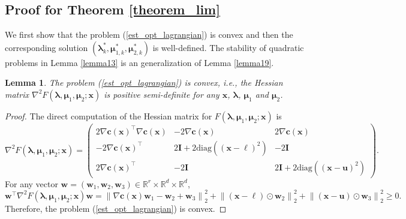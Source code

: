 \documentclass[aos]{imsart}
\numberwithin{equation}{section}
\theoremstyle{plain}
\newtheorem{lemma}{Lemma}
\begin{document}
\begin{appendix}
    \subsection{Proof for Theorem \ref{theorem_lim}}
We first show that the problem (\ref{est_opt_lagrangian}) is convex and then the corresponding solution $(\bm{\lambda}_{k}^{*}, \bm{\mu}_{1,k}^{*}, \bm{\mu}_{2,k}^{*})$ is well-defined. The stability of quadratic problems in Lemma \ref{lemma13} is an generalization of Lemma \ref{lemma19}.
    \begin{lemma}
    The problem (\ref{est_opt_lagrangian}) is convex, i.e., the Hessian matrix $\nabla^2 F(\bm{\lambda}, \bm{\mu}_{1}, \bm{\mu}_2; \bm{x})$ is positive semi-definite for any $\bm{x}$, $\bm{\lambda}$, $\bm{\mu}_{1}$ and $\bm{\mu}_2$. 
\end{lemma}


\begin{proof}
    The direct computation of the Hessian matrix for $F(\bm{\lambda}, \bm{\mu}_{1}, \bm{\mu}_2; \bm{x})$ is
    \begin{equation}
        \nabla^2 F(\bm{\lambda}, \bm{\mu}_{1}, \bm{\mu}_2; \bm{x}) = \left( \begin{array}{ccc}
            2 \nabla \bm{c}(\bm{x})^{\top} \nabla \bm{c}(\bm{x})  & -2 \nabla \bm{c}(\bm{x}) & 2 \nabla \bm{c}(\bm{x}) \\
            -2 \nabla \bm{c}(\bm{x})^{\top} & 2 \bm{I} + 2 \text{diag}\left( \left( \bm{x} - \bm{\ell} \right)^2 \right) & -2 \bm{I} \\
            2 \nabla \bm{c}(\bm{x})^{\top} & -2 \bm{I} & 2 \bm{I} + 2 \text{diag}\left( \left( \bm{x} - \bm{u} \right)^2 \right) 
        \end{array} \right).
    \end{equation}
    For any vector $\bm{w} = (\bm{w}_1, \bm{w}_2, \bm{w}_3) \in \mathbb{R}^{r} \times \mathbb{R}^{d} \times \mathbb{R}^{d}$,
    \begin{equation*}
        \bm{w}^{\top} \nabla^2 F(\bm{\lambda}, \bm{\mu}_{1}, \bm{\mu}_2; \bm{x}) \bm{w} = \left\| \nabla \bm{c}(\bm{x}) \bm{w}_1 - \bm{w}_2 + \bm{w}_3 \right\|_2^2 + \left\| \left( \bm{x} - \bm{\ell} \right) \odot \bm{w}_2 \right\|_2^2 + \left\| \left( \bm{x} - \bm{u} \right) \odot \bm{w}_3 \right\|_2^2 \geq 0.
    \end{equation*}
    Therefore, the problem (\ref{est_opt_lagrangian}) is convex.
\end{proof}



\end{appendix}
\end{document}
